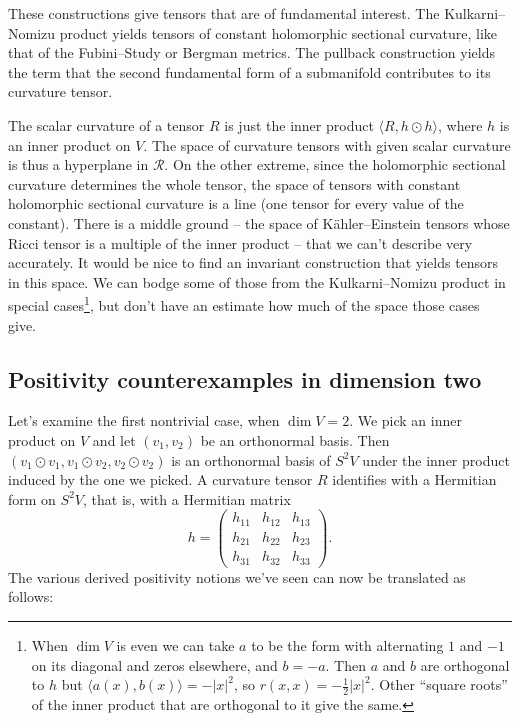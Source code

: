 \documentclass[11pt]{article}
\newcommand{\cc}[1]{\mathcal{#1}}
\begin{document}
These constructions give tensors that are of fundamental interest. The Kulkarni--Nomizu product yields tensors of constant holomorphic sectional curvature, like that of the Fubini--Study or Bergman metrics. The pullback construction yields the term that the second fundamental form of a submanifold contributes to its curvature tensor.



The scalar curvature of a tensor $R$ is just the inner product $\langle R, h \odot h \rangle$, where $h$ is an inner product on $V$. The space of curvature tensors with given scalar curvature is thus a hyperplane in $\cc R$. On the other extreme, since the holomorphic sectional curvature determines the whole tensor, the space of tensors with constant holomorphic sectional curvature is a line (one tensor for every value of the constant). There is a middle ground -- the space of K\"ahler--Einstein tensors whose Ricci tensor is a multiple of the inner product -- that we can't describe very accurately. It would be nice to find an invariant construction that yields tensors in this space. We can bodge some of those from the Kulkarni--Nomizu product in special cases\footnote{When $\dim V$ is even we can take $a$ to be the form with alternating $1$ and $-1$ on its diagonal and zeros elsewhere, and $b = -a$. Then $a$ and $b$ are orthogonal to $h$ but $\langle a(x), b(x) \rangle = - |x|^2$, so $r(x,x) = -\frac12 |x|^2$. Other ``square roots'' of the inner product that are orthogonal to it give the same.}, but don't have an estimate how much of the space those cases give.



\subsection{Positivity counterexamples in dimension two}

Let's examine the first nontrivial case, when $\dim V = 2$. We pick an inner product on $V$ and let $(v_1,v_2)$ be an orthonormal basis. Then $(v_1 \odot v_1, v_1 \odot v_2, v_2 \odot v_2)$ is an orthonormal basis of $S^2V$ under the inner product induced by the one we picked. A curvature tensor $R$ identifies with a Hermitian form on $S^2V$, that is, with a Hermitian matrix
$$
h = \begin{pmatrix}
  h_{11} & h_{12} & h_{13} \\
  h_{21} & h_{22} & h_{23} \\
  h_{31} & h_{32} & h_{33}
\end{pmatrix}.
$$
The various derived positivity notions we've seen can now be translated as follows:
\end{document}
